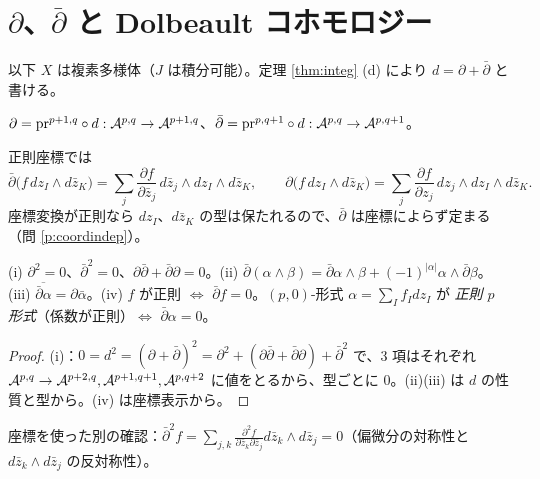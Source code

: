 \section{$\partial$、$\bar\partial$ と Dolbeault コホモロジー}\label{sec:dolbeault}

以下 $X$ は複素多様体（$J$ は積分可能）。定理 \ref{thm:integ} (d) により $d=\partial+\bar\partial$ と書ける。

\begin{defn}
$\partial=\mathrm{pr}^{p+1,q}\circ d:\mathcal A^{p,q}\to\mathcal A^{p+1,q}$、$\bar\partial=\mathrm{pr}^{p,q+1}\circ d:\mathcal A^{p,q}\to\mathcal A^{p,q+1}$。
\end{defn}
正則座標では
\[
\bar\partial\Big(f\,dz_I\wedge d\bar z_K\Big)=\sum_j\frac{\partial f}{\partial\bar z_j}\,d\bar z_j\wedge dz_I\wedge d\bar z_K,\qquad
\partial\Big(f\,dz_I\wedge d\bar z_K\Big)=\sum_j\frac{\partial f}{\partial z_j}\,dz_j\wedge dz_I\wedge d\bar z_K .
\]
座標変換が正則なら $dz_I$、$d\bar z_K$ の型は保たれるので、$\bar\partial$ は座標によらず定まる（問 \ref{p:coordindep}）。

\begin{prop}\label{prop:dbar2}\tP
(i) $\partial^2=0$、$\bar\partial^2=0$、$\partial\bar\partial+\bar\partial\partial=0$。(ii) $\bar\partial(\alpha\wedge\beta)=\bar\partial\alpha\wedge\beta+(-1)^{|\alpha|}\alpha\wedge\bar\partial\beta$。(iii) $\overline{\bar\partial\alpha}=\partial\bar\alpha$。(iv) $f$ が正則 $\iff$ $\bar\partial f=0$。$(p,0)$-形式 $\alpha=\sum_If_Idz_I$ が \emph{正則 $p$ 形式}（係数が正則）$\iff$ $\bar\partial\alpha=0$。
\end{prop}
\begin{proof}
(i)：$0=d^2=(\partial+\bar\partial)^2=\partial^2+(\partial\bar\partial+\bar\partial\partial)+\bar\partial^2$ で、3 項はそれぞれ $\mathcal A^{p,q}\to\mathcal A^{p+2,q},\mathcal A^{p+1,q+1},\mathcal A^{p,q+2}$ に値をとるから、型ごとに $0$。(ii)(iii) は $d$ の性質と型から。(iv) は座標表示から。\qedhere
\end{proof}
座標を使った別の確認：$\bar\partial^2 f=\sum_{j,k}\frac{\partial^2f}{\partial\bar z_k\partial\bar z_j}d\bar z_k\wedge d\bar z_j=0$（偏微分の対称性と $d\bar z_k\wedge d\bar z_j$ の反対称性）。

